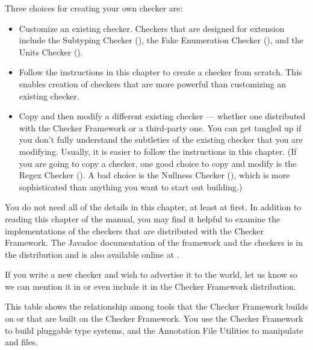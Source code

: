 Three choices for creating your own checker are:
\begin{itemize}
\item
  Customize an existing checker.
  Checkers that are designed for extension include
  the Subtyping Checker (),
  the Fake Enumeration Checker (),
  and the Units Checker ().
\item
  Follow the instructions in this chapter to create a checker from scratch.
  This enables creation of checkers that are more powerful than customizing
  an existing checker.
\item
  Copy and then modify a different existing checker --- whether
  one distributed with the Checker Framework or a third-party one.
  You can get tangled up if you don't fully understand
  the subtleties of the existing checker that you are modifying.
  Usually, it is easier to follow the instructions in this chapter.
  (If you are going to copy a checker, one good choice to copy and modify
  is the Regex Checker ().  A bad choice is
  the Nullness Checker (),
  which is more sophisticated than anything you want to start out building.)
\end{itemize}

You do not need all of the details in this chapter, at least at first.
In addition to reading this chapter of the manual, you may find it helpful
to examine the implementations of the checkers that are distributed with
the Checker Framework.
The Javadoc documentation of the framework and the checkers is in the
distribution and is also available online at
.

If you write a new checker and wish to advertise it to the world, let us
know so we can mention it in 
or even include it in the Checker Framework distribution.



This table shows the relationship among tools that the Checker Framework
builds on or that are built on the Checker Framework.
You use the Checker Framework to build pluggable type systems, and the
Annotation File Utilities to manipulate  and  files.

\newlength{\bw}
\setlength{\bw}{.5in}



